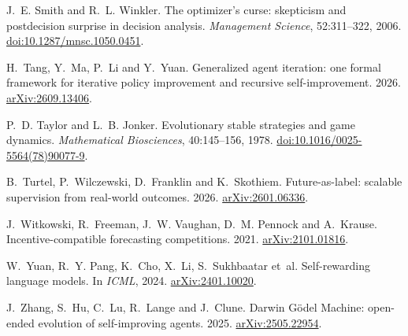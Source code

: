 \documentclass[11pt]{article}
\theoremstyle{definition}
\theoremstyle{remark}
\begin{document}
\begin{thebibliography}{}
J.~E. Smith and R.~L. Winkler. The optimizer's curse: skepticism and postdecision surprise in
decision analysis. \emph{Management Science}, 52:311--322, 2006.
\href{https://doi.org/10.1287/mnsc.1050.0451}{doi:10.1287/mnsc.1050.0451}.

H.~Tang, Y.~Ma, P.~Li and Y.~Yuan. Generalized agent iteration: one formal framework for
iterative policy improvement and recursive self-improvement. 2026.
\href{https://arxiv.org/abs/2609.13406}{arXiv:2609.13406}.

P.~D. Taylor and L.~B. Jonker. Evolutionary stable strategies and game dynamics.
\emph{Mathematical Biosciences}, 40:145--156, 1978.
\href{https://doi.org/10.1016/0025-5564(78)90077-9}{doi:10.1016/0025-5564(78)90077-9}.

B.~Turtel, P.~Wilczewski, D.~Franklin and K.~Skothiem. Future-as-label: scalable supervision
from real-world outcomes. 2026. \href{https://arxiv.org/abs/2601.06336}{arXiv:2601.06336}.

J.~Witkowski, R.~Freeman, J.~W. Vaughan, D.~M. Pennock and A.~Krause. Incentive-compatible
forecasting competitions. 2021. \href{https://arxiv.org/abs/2101.01816}{arXiv:2101.01816}.

W.~Yuan, R.~Y. Pang, K.~Cho, X.~Li, S.~Sukhbaatar et~al. Self-rewarding language models. In
\emph{ICML}, 2024. \href{https://arxiv.org/abs/2401.10020}{arXiv:2401.10020}.

J.~Zhang, S.~Hu, C.~Lu, R.~Lange and J.~Clune. Darwin G\"odel Machine: open-ended evolution of
self-improving agents. 2025. \href{https://arxiv.org/abs/2505.22954}{arXiv:2505.22954}.

\end{thebibliography}
\end{document}
